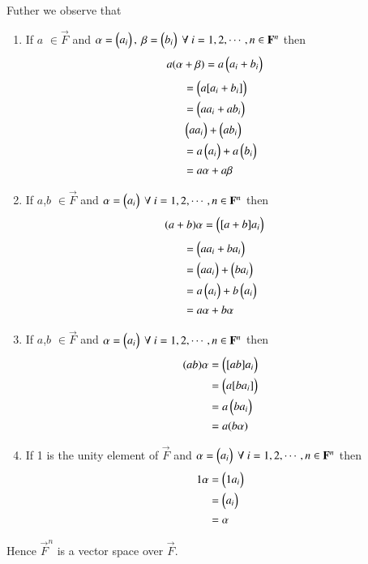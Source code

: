 Futher we observe that
\begin{enumerate}
\item If $a$ $\in \vec{F}$ and 
	$\mathbf{\alpha} = \begin{pmatrix}a_i\end{pmatrix}, \
		\mathbf{\beta}=\begin{pmatrix}b_i\end{pmatrix} \ \forall \ i=1,2,\cdots,n \in \mathbf{F}^n$ 
then
\begin{align}
	a(\mathbf{\alpha}+\mathbf{\beta}) &=
	a\begin{pmatrix}a_i+b_i\end{pmatrix} 
\end{align}
\begin{align}
	&=\begin{pmatrix}a[a_i+b_i]\end{pmatrix} \\
	&=\begin{pmatrix}aa_i+ab_i\end{pmatrix} \\
	&\begin{pmatrix}aa_i\end{pmatrix}
	+ \begin{pmatrix}ab_i\end{pmatrix} \\
	&=a\begin{pmatrix}a_i\end{pmatrix}
	+ a\begin{pmatrix}b_i\end{pmatrix} \\
	&=a\alpha+a\beta
\end{align}
\item If $a$,$b$ $\in \vec{F}$ and 
	$\alpha=\myvec{a_i} \ \forall \ i=1,2,\cdots,n \in \vec{F}^n$ then
\begin{align}
	(a+b)\alpha
	&=\begin{pmatrix}[a+b]a_i\end{pmatrix} 
\end{align}
\begin{align}
	&=\begin{pmatrix}aa_i+ba_i\end{pmatrix} \\ 
	&=\begin{pmatrix}aa_i\end{pmatrix}+\begin{pmatrix}ba_i\end{pmatrix} \\
	&=a\begin{pmatrix}a_i\end{pmatrix}+b\begin{pmatrix}a_i\end{pmatrix} \\
	&=a\alpha+b\alpha
\end{align}
\item If $a$,$b$ $\in \vec{F}$ and 
	$\alpha=\myvec{a_i} \ \forall \ i=1,2,\cdots,n \in \vec{F}^n$ 
then
\begin{align}
     (ab)\alpha&=\begin{pmatrix}[ab]a_i\end{pmatrix} \\
	  &=\begin{pmatrix}a[ba_i]\end{pmatrix} \\
	  &=a\begin{pmatrix}ba_i\end{pmatrix} \\
	  &=a(b\alpha)
\end{align}
\item If 1 is the unity element of $\vec{F}$ and 
	$\alpha=\myvec{a_i} \ \forall \ i=1,2,\cdots,n \in \vec{F}^n$ then
\begin{align}
	1\alpha &=\begin{pmatrix}1a_i\end{pmatrix} \\
		&=\begin{pmatrix}a_i\end{pmatrix} \\
		&= \alpha
\end{align}
\end{enumerate}
Hence $\vec{F}^n$ is a vector space over $\vec{F}$.
